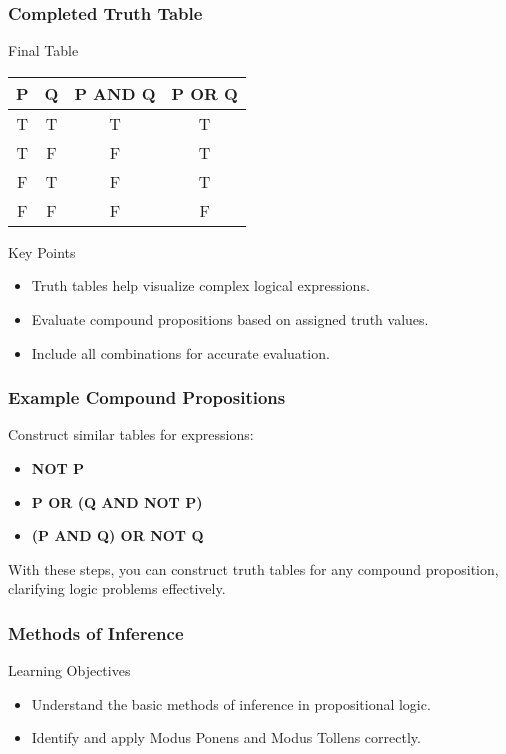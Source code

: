 \documentclass[aspectratio=169]{beamer}
\begin{document}
\begin{frame}[fragile]
    \frametitle{Completed Truth Table}
    \begin{block}{Final Table}
    \begin{table}[]
        \centering
        \begin{tabular}{|c|c|c|c|}
            \hline
            P & Q & P AND Q & P OR Q \\ \hline
            T & T & T & T \\ \hline
            T & F & F & T \\ \hline
            F & T & F & T \\ \hline
            F & F & F & F \\ \hline
        \end{tabular}
    \end{table}
    \end{block}
    
    \begin{block}{Key Points}
        \begin{itemize}
            \item Truth tables help visualize complex logical expressions.
            \item Evaluate compound propositions based on assigned truth values.
            \item Include all combinations for accurate evaluation.
        \end{itemize}
    \end{block}
\end{frame}

\begin{frame}[fragile]
    \frametitle{Example Compound Propositions}
    Construct similar tables for expressions:
    \begin{itemize}
        \item \textbf{NOT P}
        \item \textbf{P OR (Q AND NOT P)}
        \item \textbf{(P AND Q) OR NOT Q}
    \end{itemize}

    With these steps, you can construct truth tables for any compound proposition, clarifying logic problems effectively.
\end{frame}

\begin{frame}[fragile]
    \frametitle{Methods of Inference}
    \begin{block}{Learning Objectives}
        \begin{itemize}
            \item Understand the basic methods of inference in propositional logic.
            \item Identify and apply Modus Ponens and Modus Tollens correctly.
        \end{itemize}
    \end{block}
\end{frame}
\end{document}
